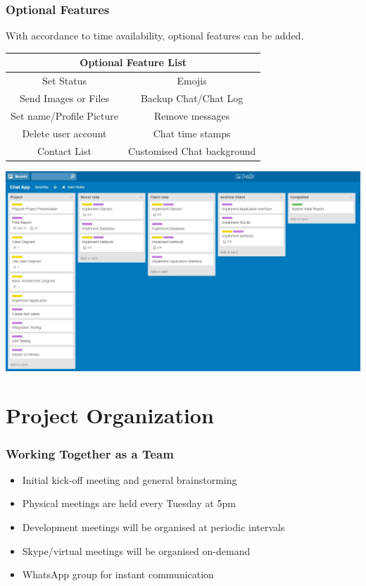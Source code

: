 \documentclass[11pt,compress,xcolor={usenames,dvipsnames}]{beamer}
\begin{document}
\begin{frame}
\frametitle{Optional Features}
With accordance to time availability, optional features can be added.

\begin {table}[H]
\begin{center}
\begin{tabular}{|c|c|}
\hline 
\multicolumn{2}{|c|}{\textbf{Optional Feature List}}\\
\hline 
\rule[-1ex]{0pt}{2.5ex} Set Status & Emojis \\ 
\hline 
\rule[-1ex]{0pt}{2.5ex} Send Images or Files & Backup Chat/Chat Log \\ 
\hline 
\rule[-1ex]{0pt}{2.5ex} Set name/Profile Picture & Remove messages \\ 
\hline 
\rule[-1ex]{0pt}{2.5ex} Delete user account & Chat time stamps  \\ 
\hline 
\rule[-1ex]{0pt}{2.5ex} Contact List  & Customised Chat background  \\ 
\hline 
\end{tabular} 
\end{center}
\end {table}
\end{frame}

\begin{frame}
\begin{center}
\includegraphics[scale=0.3]{trelloboard.jpg}

\end{center}\end{frame}

 
\section{Project Organization}
\begin{frame}
\frametitle{Working Together as a Team}
\begin{itemize}
\item Initial kick-off meeting and general brainstorming
\item Physical meetings are held every Tuesday at 5pm
\item Development meetings will be organised at periodic intervals
\item Skype/virtual meetings will be organised on-demand 
\item WhatsApp group for instant communication
\end{itemize}
\end{frame}
\end{document}
